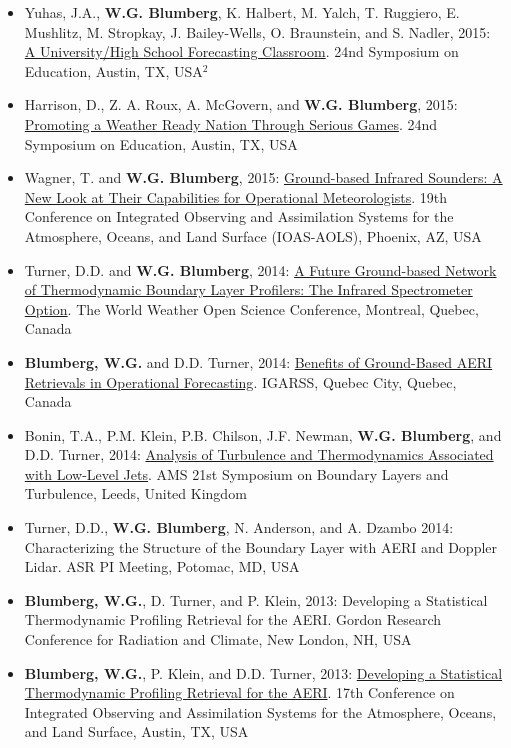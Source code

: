 \documentclass[10pt]{res} %
\begin{document}
\begin{resume}
\begin{itemize}
\item Yuhas, J.A., \textbf{W.G. Blumberg}, K. Halbert, M. Yalch, T. Ruggiero, E. Mushlitz, M. Stropkay, J. Bailey-Wells, O. Braunstein, and S. Nadler, 2015: \href{https://ams.confex.com/ams/95Annual/webprogram/Paper265787.html}{A University/High School Forecasting Classroom}. 24nd Symposium on Education, Austin, TX, USA$^{2}$
\item Harrison, D., Z. A. Roux, A. McGovern, and \textbf{W.G. Blumberg}, 2015: \href{https://ams.confex.com/ams/95Annual/webprogram/Paper259312.html}{Promoting a Weather Ready Nation Through Serious Games}. 24nd Symposium on Education, Austin, TX, USA
\item Wagner, T. and \textbf{W.G. Blumberg}, 2015: \href{https://ams.confex.com/ams/95Annual/webprogram/Paper260639.html}{Ground-based Infrared Sounders: A New Look at Their Capabilities for Operational Meteorologists}. 19th Conference on Integrated Observing and Assimilation Systems for the Atmosphere, Oceans, and Land Surface (IOAS-AOLS), Phoenix, AZ, USA
\item Turner, D.D. and \textbf{W.G. Blumberg}, 2014: \href{https://www.wmo.int/pages/prog/arep/wwrp/new/wwosc/documents/turner_profiling_vision_wwosc.pdf}{A Future Ground-based Network of Thermodynamic Boundary Layer Profilers: The Infrared Spectrometer Option}. The World Weather Open Science Conference, Montreal, Quebec, Canada
\item \textbf{Blumberg, W.G.} and D.D. Turner, 2014: \href{ftp://ftp.legos.obs-mip.fr/pub/tmp3m/IGARSS2014/abstracts/3989.pdf}{Benefits of Ground-Based AERI Retrievals in Operational Forecasting}. IGARSS, Quebec City, Quebec, Canada
\item Bonin, T.A., P.M. Klein, P.B. Chilson, J.F. Newman, \textbf{W.G. Blumberg}, and D.D. Turner, 2014: \href{https://ams.confex.com/ams/21BLT/webprogram/Paper248197.html}{Analysis of Turbulence and Thermodynamics Associated with Low-Level Jets}. AMS 21st Symposium on Boundary Layers and Turbulence, Leeds, United Kingdom
\item Turner, D.D., \textbf{W.G. Blumberg}, N. Anderson, and A. Dzambo  2014: Characterizing the Structure of the Boundary Layer with AERI and Doppler Lidar. ASR PI Meeting, Potomac, MD, USA
\item \textbf{Blumberg, W.G.}, D. Turner, and P. Klein, 2013: Developing a Statistical Thermodynamic Profiling Retrieval for the AERI. Gordon Research Conference for Radiation and Climate, New London, NH, USA
\item \textbf{Blumberg, W.G.}, P. Klein, and D.D. Turner, 2013: \href{https://ams.confex.com/ams/93Annual/webprogram/Paper217725.html}{Developing a Statistical Thermodynamic Profiling Retrieval for the AERI}. 17th Conference on Integrated Observing and Assimilation Systems for the Atmosphere, Oceans, and Land Surface, Austin, TX, USA 

\end{itemize}
\end{resume}
\end{document}
